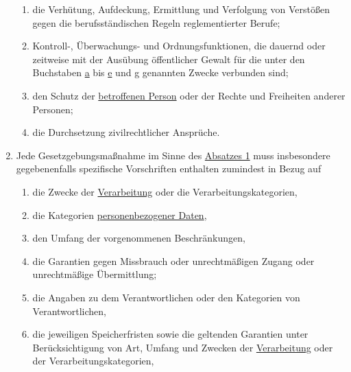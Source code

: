 \begin{enumerate}
\begin{enumerate}
    \item die Verhütung, Aufdeckung, Ermittlung und Verfolgung von Verstößen gegen die berufsständischen Regeln
     reglementierter Berufe;
    \label{itm:23-1g}

    \item Kontroll-, Überwachungs- und Ordnungsfunktionen, die dauernd oder zeitweise mit der Ausübung öffentlicher
     Gewalt für die unter den Buchstaben \hyperref[itm:23-1a]{a} bis \hyperref[itm:23-1e]{e} und \hyperref[itm:23-1g]
     {g} genannten Zwecke verbunden sind;
    \label{itm:23-1h}

    \item den Schutz der \hyperref[itm:04-1]{betroffenen Person} oder der Rechte und Freiheiten anderer Personen;
    \label{itm:23-1i}

    \item die Durchsetzung zivilrechtlicher Ansprüche.
    \label{itm:23-1j}

  \end{enumerate}

  \item Jede Gesetzgebungsmaßnahme im Sinne des \hyperref[itm:23-1]{Absatzes 1} muss insbesondere gegebenenfalls
   spezifische Vorschriften enthalten zumindest in Bezug auf
  \label{itm:23-2}

  \begin{enumerate}
  
    \item die Zwecke der \hyperref[itm:04-2]{Verarbeitung} oder die Verarbeitungskategorien,
    \label{itm:23-2a}

    \item die Kategorien \hyperref[itm:04-1]{personenbezogener Daten},
    \label{itm:23-2b}

    \item den Umfang der vorgenommenen Beschränkungen,
    \label{itm:23-2c}

    \item die Garantien gegen Missbrauch oder unrechtmäßigen Zugang oder unrechtmäßige Übermittlung;
    \label{itm:23-2d}

    \item die Angaben zu dem Verantwortlichen oder den Kategorien von Verantwortlichen,
    \label{itm:23-2e}

    \item die jeweiligen Speicherfristen sowie die geltenden Garantien unter Berücksichtigung von Art, Umfang und
     Zwecken der \hyperref[itm:04-2]{Verarbeitung} oder der Verarbeitungskategorien,
    \label{itm:23-2f}


\end{enumerate}
\end{enumerate}
